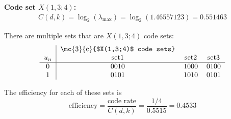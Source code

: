 \begin{example}{\bf Code set $X(1,3;4)$:}
\begin{eqnarray*}
   C(d,k) 
     = \log_2(\lambda_{\mathrm{max}})
     = \log_2(1.46557123)
     = 0.551463
\end{eqnarray*}

There are multiple sets that are $X(1,3;4)$ code sets:
\[
\begin{tabular}{c|ccc}
                 & \mc{3}{c}{$X(1,3;4)$ code sets}  \\
   $u_n$         & set1 & set2 & set3 \\
   \hline
   0 & 0010 & 1000 & 0100 \\
   1 & 0101 & 1010 & 0101
\end{tabular}
\]

The efficiency for each of these sets is
\[
    \mathrm{efficiency} 
    = \frac{\mbox{code rate}}{C(d,k)} 
    = \frac{1/4}{0.5515} 
    = 0.4533
\]
\end{example}


